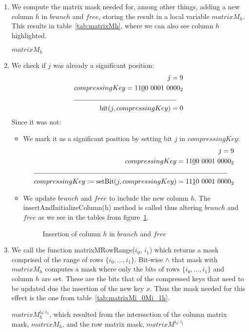 \begin{enumerate}
    \item
    We compute the matrix mask needed for, among other things, adding a new column $h$ in $branch$ and $free$, storing the result in a local variable $matrixM_h$. This results in table~\ref{tab:matrixMh}, where we can also see column $h$ highlighted.
    \begin{table}[H]
    \centering
    
    \caption{$matrixM_h$}
    \label{tab:matrixMh}
    \end{table}
    
    \item
    We check if $j$ was already a significant position:
    \begin{align*}
        j = 9 \\
        compressingKey = 11\underline{0}0\ 0001\ 0000_2 \\
        \cline{1-2}
        \text{bit}(j, compressingKey) = 0
    \end{align*}
    Since it was not:
    \begin{itemize}
        \item
        We mark it as a significant position by setting bit $j$ in $compressingKey$:
        \begin{align*}
            j = 9 \\
            compressingKey = 11\underline{0}0\ 0001\ 0000_2\\
            \cline{1-2}
             compressingKey := \text{setBit}(j, compressingKey) = 11\underline{1}0\ 0001\ 0000_2
        \end{align*}
        
        \item
        We update $branch$ and $free$ to include the new column $h$. The {\ttfamily insertAndInitializeColumn(h)} method is called thus altering $branch$ and $free$ as we see in the tables from figure~\ref{fig:branchAndFreeInsertHcolumn}.
        \begin{figure}[H]
        \centering
        
        \caption{Insertion of column $h$ in $branch$ and $free$}
        \label{fig:branchAndFreeInsertHcolumn}
        \end{figure}
    \end{itemize}

    \item
    We call the function {\ttfamily matrixMRowRange($i_0$, $i_1$)} which returns a mask comprised of the range of rows $\{ i_0, \dots, i_1 \}$. Bit-wise $\wedge$ that mask with $matrixM_h$ computes a mask where only the bits of rows $\{ i_0, \dots, i_1 \}$ and column $h$ are set. These are the bits that of the compressed keys that need to be updated due the insertion of the new key $x$. Thus the mask needed for this effect is the one from table~\ref{tab:matrixMi_0Mi_1h}.
    \begin{table}[H]
    \centering
    
    \caption{$matrixM^{i_0:i_1}_h$, which resulted from the intersection of the column matrix mask, $matrixM_h$, and the row matrix mask, $matrixM^{i_0:i_1}$}
    \label{tab:matrixMi_0Mi_1h}
    \end{table}
    

\end{enumerate}
